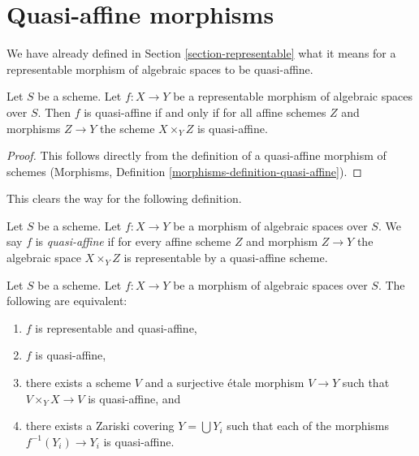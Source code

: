 \section{Quasi-affine morphisms}
\label{section-quasi-affine}

\noindent
We have already defined in Section \ref{section-representable}
what it means for a representable morphism of algebraic spaces
to be quasi-affine.

\begin{lemma}
\label{lemma-quasi-affine-representable}
Let $S$ be a scheme. Let $f : X \to Y$ be a representable
morphism of algebraic spaces over $S$. Then
$f$ is quasi-affine if and only if for all affine schemes $Z$
and morphisms $Z \to Y$ the scheme $X \times_Y Z$ is quasi-affine.
\end{lemma}

\begin{proof}
This follows directly from the definition of a quasi-affine morphism
of schemes
(Morphisms, Definition \ref{morphisms-definition-quasi-affine}).
\end{proof}

\noindent
This clears the way for the following definition.

\begin{definition}
\label{definition-quasi-affine}
Let $S$ be a scheme.
Let $f : X \to Y$ be a morphism of algebraic spaces over $S$.
We say $f$ is {\it quasi-affine} if for every affine scheme $Z$ and
morphism $Z \to Y$ the algebraic space $X \times_Y Z$ is representable
by a quasi-affine scheme.
\end{definition}

\begin{lemma}
\label{lemma-quasi-affine-local}
Let $S$ be a scheme.
Let $f : X \to Y$ be a morphism of algebraic spaces over $S$.
The following are equivalent:
\begin{enumerate}
\item $f$ is representable and quasi-affine,
\item $f$ is quasi-affine,
\item there exists a scheme $V$ and a surjective \'etale morphism
$V \to Y$ such that $V \times_Y X \to V$ is quasi-affine, and
\item there exists a Zariski covering $Y = \bigcup Y_i$ such
that each of the morphisms $f^{-1}(Y_i) \to Y_i$ is quasi-affine.
\end{enumerate}
\end{lemma}

